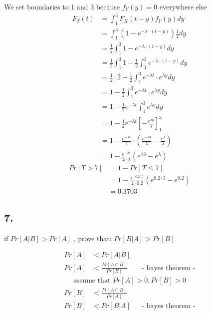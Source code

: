 We set boundaries to 1 and 3 because $f_Y(y) = 0$ everywhere else
\begin{align*}
F_{T}\left(t\right)&=\int _{1}^{3}F_{X}\left(t-y\right)f_{Y}\left(y\right)dy\\
&=\int _{1}^{3}(1-e^{-\lambda \cdot \left(t-y\right)}) \frac{1}{2} dy\\
&=\frac{1}{2} \int _{1}^{3}1-e^{-\lambda \cdot \left(t-y\right)} dy\\
&=\frac{1}{2} \int _{1}^{3}1 - \frac{1}{2} \int _{1}^{3} e^{-\lambda \cdot \left(t-y\right)} dy\\
&=\frac{1}{2} \cdot 2 - \frac{1}{2} \int _{1}^{3} e^{-\lambda t}\cdot e^{\lambda y} dy\\
&= 1 - \frac{1}{2} \int _{1}^{3} e^{-\lambda t}\cdot e^{\lambda y} dy\\
&= 1 - \frac{1}{2} e^{-\lambda t} \int _{1}^{3} e^{\lambda y} dy\\
&= 1 - \frac{1}{2} e^{-\lambda t} \left[ -\frac{e^{\lambda y}}{\lambda} \right]_1^3\\
&= 1 - \frac{e^{-\lambda t}}{2} \cdot \left(\frac{e^{-\lambda 3}}{\lambda} -\frac{e^{\lambda}}{\lambda}\right)\\
&=1-\frac{e^{{-\lambda t}}}{2\cdot \lambda }\left(e^{{\lambda 3}}-e^{\lambda }\right)
\end{align*}
\begin{align*}
Pr\left[T> 7\right]&=1-Pr\left[T\le 7\right]\\
&= 1-\frac{e^{{-0.2 \cdot 7}}}{2\cdot 0.2 }\left(e^{{0.2 \cdot 3}}-e^{0.2 }\right) \\
&=0.3703
\end{align*}

\subsection*{ 7. }

if  $Pr\left[A|B\right]> Pr\left[A\right]$ , prove that:  $Pr\left[B|A\right]> Pr\left[B\right]$

\begin{align*}
Pr\left[A\right]&< Pr\left[A|B\right]\\
Pr\left[A\right]&< \frac{Pr\left[A\cap B\right]}{Pr\left[B\right]}&& \text{-  bayes theorem -}
\end{align*}
\begin{align*}
\text{assume that }Pr\left[A\right]> 0,Pr\left[B\right]> 0
\end{align*}
\begin{align*}
Pr\left[B\right]&< \frac{Pr\left[A\cap B\right]}{Pr\left[A\right]}\\
Pr\left[B\right]&< Pr\left[B|A\right]&& \text{-  bayes theorem -}
\end{align*}

